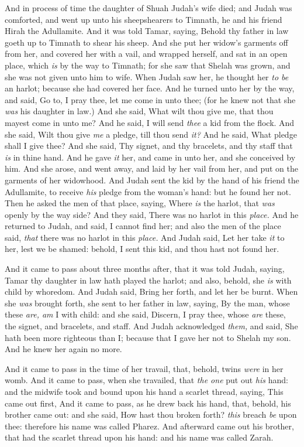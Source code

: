 \documentclass[11pt,letterpaper,oneside]{memoir}
\begin{document}
And in process of time the daughter of Shuah Judah's wife died; and
Judah was comforted, and went up unto his sheepshearers to Timnath, he
and his friend Hirah the Adullamite. And it was told Tamar, saying,
Behold thy father in law goeth up to Timnath to shear his sheep. And she
put her widow's garments off from her, and covered her with a vail, and
wrapped herself, and sat in an open place, which \emph{is} by the way to
Timnath; for she saw that Shelah was grown, and she was not given unto
him to wife. When Judah saw her, he thought her \emph{to be} an harlot;
because she had covered her face. And he turned unto her by the way, and
said, Go to, I pray thee, let me come in unto thee; (for he knew not
that she \emph{was} his daughter in law.) And she said, What wilt thou
give me, that thou mayest come in unto me? And he said, I will send
\emph{thee} a kid from the flock. And she said, Wilt thou give \emph{me}
a pledge, till thou send \emph{it? }And he said, What pledge shall I
give thee? And she said, Thy signet, and thy bracelets, and thy staff
that \emph{is} in thine hand. And he gave \emph{it} her, and came in
unto her, and she conceived by him. And she arose, and went away, and
laid by her vail from her, and put on the garments of her widowhood. And
Judah sent the kid by the hand of his friend the Adullamite, to receive
\emph{his} pledge from the woman's hand: but he found her not. Then he
asked the men of that place, saying, Where \emph{is} the harlot, that
\emph{was} openly by the way side? And they said, There was no harlot in
this \emph{place. }And he returned to Judah, and said, I cannot find
her; and also the men of the place said, \emph{that} there was no harlot
in this \emph{place. }And Judah said, Let her take \emph{it} to her,
lest we be shamed: behold, I sent this kid, and thou hast not found her.

And it came to pass about three months after, that it was told Judah,
saying, Tamar thy daughter in law hath played the harlot; and also,
behold, she \emph{is} with child by whoredom. And Judah said, Bring her
forth, and let her be burnt. When she \emph{was} brought forth, she sent
to her father in law, saying, By the man, whose these \emph{are, am} I
with child: and she said, Discern, I pray thee, whose \emph{are} these,
the signet, and bracelets, and staff. And Judah acknowledged
\emph{them,} and said, She hath been more righteous than I; because that
I gave her not to Shelah my son. And he knew her again no more.

And it came to pass in the time of her travail, that, behold, twins
\emph{were} in her womb. And it came to pass, when she travailed, that
\emph{the one} put out \emph{his} hand: and the midwife took and bound
upon his hand a scarlet thread, saying, This came out first, And it came
to pass, as he drew back his hand, that, behold, his brother came out:
and she said, How hast thou broken forth? \emph{this} breach \emph{be}
upon thee: therefore his name was called Pharez. And afterward came out
his brother, that had the scarlet thread upon his hand: and his name was
called Zarah.
\end{document}
